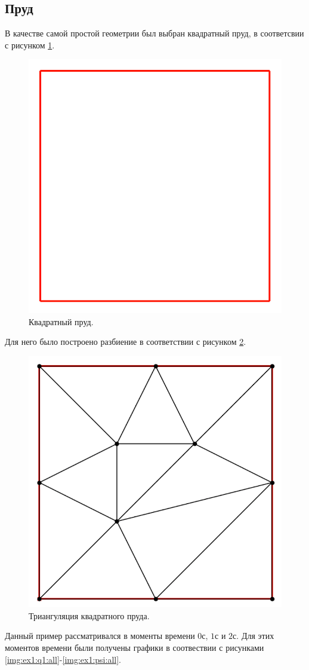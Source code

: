 \documentclass[14pt]{extreport}
\begin{document}
\subsection{Пруд}

В качестве самой простой геометрии был выбран квадратный пруд, в соответсвии с рисунком \ref{img:ex1:contour}.

\begin{figure}[H]
\centerline{
\includegraphics[width=0.5\linewidth]{images/ex1/contour}}
\caption{Квадратный пруд.}
\label{img:ex1:contour}
\end{figure}

Для него было построено разбиение в соответствии с рисунком \ref{img:ex1:mesh}.

\begin{figure}[H]
\centerline{
\includegraphics[width=0.5\linewidth]{images/ex1/mesh}}
\caption{Триангуляция квадратного пруда.}
\label{img:ex1:mesh}
\end{figure}


Данный пример рассматривался в моменты времени $0$с, $1$с и $2$с. Для этих моментов времени были получены графики в соотвествии с рисунками \ref{img:ex1:q1:all}-\ref{img:ex1:psi:all}.
\end{document}
